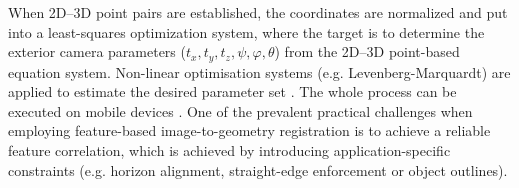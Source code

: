\documentclass[review]{elsarticle}
\begin{document}
When 2D--3D point pairs are established, the coordinates are normalized and put into a least-squares optimization system, where the target is to determine the exterior camera parameters ($t_x,t_y,t_z,\psi,\varphi,\theta$) from the 2D--3D point-based equation system. Non-linear optimisation systems (e.g. Levenberg-Marquardt) are applied to estimate the desired parameter set \cite{Torr2000}. The whole process can be executed on mobile devices \cite{Kehl2016_ISPRS}. One of the prevalent practical challenges when employing feature-based image-to-geometry registration is to achieve a reliable feature correlation, which is achieved by introducing application-specific constraints (e.g. horizon alignment, straight-edge enforcement or object outlines).


\end{document}
